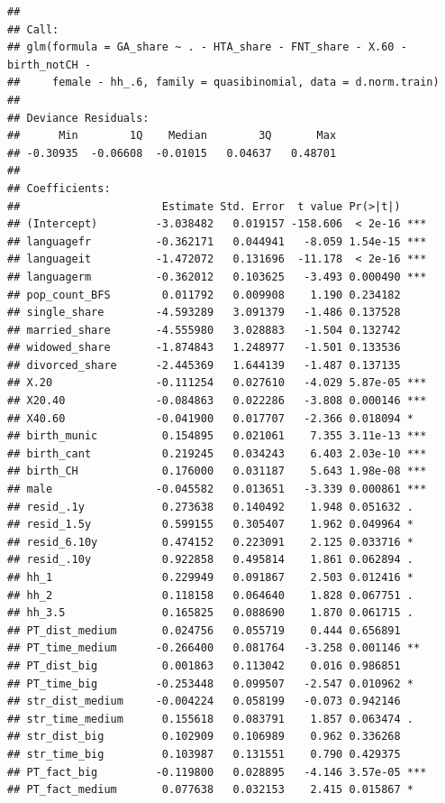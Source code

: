 \documentclass[
]{article}
\begin{document}
\begin{verbatim}
## 
## Call:
## glm(formula = GA_share ~ . - HTA_share - FNT_share - X.60 - birth_notCH - 
##     female - hh_.6, family = quasibinomial, data = d.norm.train)
## 
## Deviance Residuals: 
##      Min        1Q    Median        3Q       Max  
## -0.30935  -0.06608  -0.01015   0.04637   0.48701  
## 
## Coefficients:
##                      Estimate Std. Error  t value Pr(>|t|)    
## (Intercept)         -3.038482   0.019157 -158.606  < 2e-16 ***
## languagefr          -0.362171   0.044941   -8.059 1.54e-15 ***
## languageit          -1.472072   0.131696  -11.178  < 2e-16 ***
## languagerm          -0.362012   0.103625   -3.493 0.000490 ***
## pop_count_BFS        0.011792   0.009908    1.190 0.234182    
## single_share        -4.593289   3.091379   -1.486 0.137528    
## married_share       -4.555980   3.028883   -1.504 0.132742    
## widowed_share       -1.874843   1.248977   -1.501 0.133536    
## divorced_share      -2.445369   1.644139   -1.487 0.137135    
## X.20                -0.111254   0.027610   -4.029 5.87e-05 ***
## X20.40              -0.084863   0.022286   -3.808 0.000146 ***
## X40.60              -0.041900   0.017707   -2.366 0.018094 *  
## birth_munic          0.154895   0.021061    7.355 3.11e-13 ***
## birth_cant           0.219245   0.034243    6.403 2.03e-10 ***
## birth_CH             0.176000   0.031187    5.643 1.98e-08 ***
## male                -0.045582   0.013651   -3.339 0.000861 ***
## resid_.1y            0.273638   0.140492    1.948 0.051632 .  
## resid_1.5y           0.599155   0.305407    1.962 0.049964 *  
## resid_6.10y          0.474152   0.223091    2.125 0.033716 *  
## resid_.10y           0.922858   0.495814    1.861 0.062894 .  
## hh_1                 0.229949   0.091867    2.503 0.012416 *  
## hh_2                 0.118158   0.064640    1.828 0.067751 .  
## hh_3.5               0.165825   0.088690    1.870 0.061715 .  
## PT_dist_medium       0.024756   0.055719    0.444 0.656891    
## PT_time_medium      -0.266400   0.081764   -3.258 0.001146 ** 
## PT_dist_big          0.001863   0.113042    0.016 0.986851    
## PT_time_big         -0.253448   0.099507   -2.547 0.010962 *  
## str_dist_medium     -0.004224   0.058199   -0.073 0.942146    
## str_time_medium      0.155618   0.083791    1.857 0.063474 .  
## str_dist_big         0.102909   0.106989    0.962 0.336268    
## str_time_big         0.103987   0.131551    0.790 0.429375    
## PT_fact_big         -0.119800   0.028895   -4.146 3.57e-05 ***
## PT_fact_medium       0.077638   0.032153    2.415 0.015867 *  

\end{verbatim}
\end{document}
